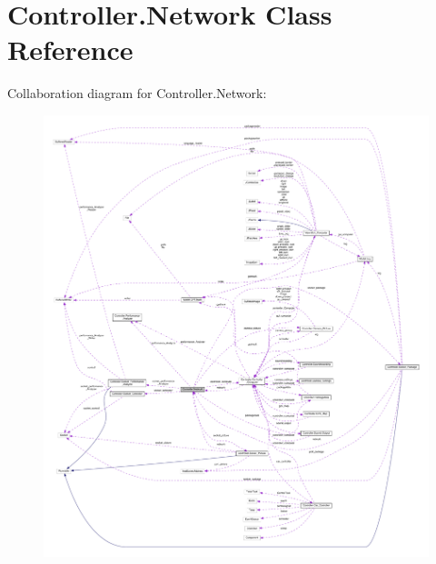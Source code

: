 \hypertarget{class_controller_1_1_network}{}\section{Controller.\+Network Class Reference}
\label{class_controller_1_1_network}


Collaboration diagram for Controller.\+Network\+:
\nopagebreak
\begin{figure}[H]
\begin{center}
\leavevmode
\includegraphics[width=350pt]{class_controller_1_1_network__coll__graph}
\end{center}
\end{figure}
